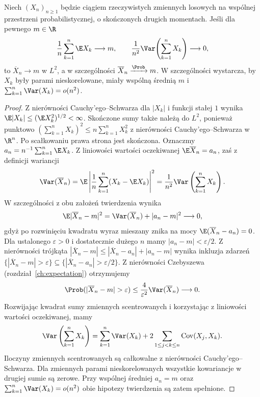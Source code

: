 \begin{twierdzenie}
Niech $(X_n)_{n\geq1}$ będzie ciągiem rzeczywistych zmiennych
losowych na wspólnej przestrzeni probabilistycznej,
o skończonych drugich momentach. Jeśli dla pewnego $m\in\R$
\[
\frac1n\sum_{k=1}^n\E X_k\longrightarrow m,
\qquad
\frac1{n^2}\Var\!\left(\sum_{k=1}^nX_k\right)\longrightarrow0,
\]
to $\overline X_n\to m$ w $L^2$, a w szczególności
$\overline X_n\xrightarrow{\Prob}m$.
W szczególności wystarcza, by $X_k$ były parami
nieskorelowane, miały wspólną średnią $m$ i
$\sum_{k=1}^n\Var(X_k)=o(n^2)$.
\end{twierdzenie}
\begin{proof}
Z nierówności Cauchy'ego--Schwarza dla $|X_k|$ i
funkcji stałej $1$ wynika
$\E|X_k|\leq(\E X_k^2)^{1/2}<\infty$.
Skończone sumy także należą do $L^2$, ponieważ
punktowo $(\sum_{k=1}^n X_k)^2\leq n\sum_{k=1}^n X_k^2$
z nierówności Cauchy'ego--Schwarza w $\R^n$.
Po scałkowaniu prawa strona jest skończona.
Oznaczmy $a_n=n^{-1}\sum_{k=1}^n\E X_k$.
Z liniowości wartości oczekiwanej
$\E\overline X_n=a_n$, zaś z definicji wariancji
\[
\Var(\overline X_n)
=\E\left|\frac1n\sum_{k=1}^n(X_k-\E X_k)\right|^2
=\frac1{n^2}\Var\left(\sum_{k=1}^nX_k\right).
\]
W szczególności z obu założeń twierdzenia wynika
\[
\E|\overline X_n-m|^2
=\Var(\overline X_n)+|a_n-m|^2\longrightarrow0,
\]
gdyż po rozwinięciu kwadratu wyraz mieszany znika
na mocy $\E(\overline X_n-a_n)=0$.
Dla ustalonego $\varepsilon>0$ i dostatecznie
dużego $n$ mamy $|a_n-m|<\varepsilon/2$.
Z nierówności trójkąta
$|\overline X_n-m|\leq|\overline X_n-a_n|+|a_n-m|$
wynika inkluzja zdarzeń
$\{|\overline X_n-m|>\varepsilon\}\subseteq
\{|\overline X_n-a_n|>\varepsilon/2\}$.
Z nierówności Czebyszewa (rozdział~\ref{ch:expectation}) otrzymujemy
\[
\Prob(|\overline X_n-m|>\varepsilon)
\leq\frac{4}{\varepsilon^2}\Var(\overline X_n)
\longrightarrow0.
\]
Rozwijając kwadrat sumy zmiennych scentrowanych
i korzystając z liniowości wartości oczekiwanej, mamy
\[
\Var\left(\sum_{k=1}^n X_k\right)
=\sum_{k=1}^n\Var(X_k)
+2\sum_{1\leq j<k\leq n}\operatorname{Cov}(X_j,X_k).
\]
Iloczyny zmiennych scentrowanych są całkowalne
z nierówności Cauchy'ego--Schwarza.
Dla zmiennych parami nieskorelowanych wszystkie
kowariancje w drugiej sumie są zerowe. Przy wspólnej
średniej $a_n=m$ oraz $\sum_{k=1}^n\Var(X_k)=o(n^2)$
obie hipotezy twierdzenia są zatem spełnione.
\end{proof}

